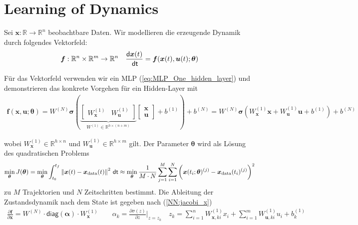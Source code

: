\documentclass[a4paper, 12pt]{scrartcl}
\newcommand{\norm}[1]{\left\lVert#1\right\lVert}
\newcommand{\dt}{\thinspace \mathsf{dt}}
\begin{document}
\newpage


\section{Learning of Dynamics}


Sei $\bm{x}:\mathbb{R} \to \mathbb{R}^n$ beobachtbare Daten.
Wir modellieren die erzeugende Dynamik durch folgendes Vektorfeld:
\begin{align}
    \bm{f}:\mathbb{R}^{n} \times \mathbb{R}^{m} \to \mathbb{R}^n
    \quad
    \frac{\mathsf{d} \bm{x}(t)}{\dt} = \bm{f}(\bm{x}(t), \bm{u}(t); \bm{\theta}) 
    \label{eq:Neural_Dynamic}
\end{align}

Für das Vektorfeld verwenden wir ein MLP (\ref{eq:MLP_One_hidden_layer}) 
und demonstrieren das konkrete Vorgehen für ein Hidden-Layer mit
%
\begin{align}\label{eq:MLP_with_control}
    \bm{f}(\bm{x},\bm{u};{\bm{\theta}})
    =
    W^{(N)} \bm{\sigma}
    \left(
        \underbrace{
            \begin{bmatrix}
                W_{\bm{x}}^{(1)} 
                &
                W_{\bm{u}}^{(1)} 
            \end{bmatrix} 
        }_{W^{(1)} \in \mathbb{R}^{h \times (n+m)}}
        \begin{bmatrix}
            \bm{x} \\
            \bm{u}    
        \end{bmatrix}
        + 
        b^{(1)}
    \right)
    +
    b^{(N)}
    =
    W^{(N)} \bm{\sigma}
    \left(
        W_{\bm{x}}^{(1)} \bm{x} + W_{\bm{u}}^{(1)} \bm{u} + b^{(1)}
    \right)
    +
    b^{(N)}
\end{align}

wobei $W_{\bm{x}}^{(1)} \in \mathbb{R}^{h \times n}$ 
und $W_{\bm{u}}^{(1)} \in \mathbb{R}^{h \times m}$ gilt.
Der Parameter $\bm{\theta}$ wird als Lösung des quadratischen Problems 
\begin{align*}
    \min_{\bm{\theta}}
    J(\bm{\theta}) 
    =
    \min_{\bm{\theta}}
    \int_{t_0}^{t_f}
    \norm{\bm{x}(t) - \bm{x}_{\text{data}}(t)}^2 \dt
    \approx
    \min_{\bm{\theta}}
    \frac{1}{M \cdot N}
    \sum_{j=1}^{M}
    \sum_{i=1}^{N}
    \left(
        \vphantom{\int}
        \bm{x}(t_i; \bm{\theta})^{(j)} - \bm{x}_{\text{data}}(t_i)^{(j)}
    \right)^2
\end{align*}
%
zu $M$ Trajektorien und $N$ Zeitschritten bestimmt. 
Die Ableitung der Zustandsdynamik nach dem State ist gegeben nach (\ref{NN:jacobi_x})
\begin{align}\label{dynamics:f_x}
    \frac{\partial \bm{f}}{\partial \bm{x}} 
    =
    W^{(N)} \cdot \mathsf{diag}\left(\bm{\alpha}\right) \cdot W^{(1)}_{\bm{x}}
    \qquad
    \alpha_k
    =
    \frac{\partial \sigma(z)}{\partial z}
    \bigg|_{z= z_k}
    \quad
    z_k 
    = 
    \sum_{i=1}^{n} W_{\bm{x}, ki}^{(1)} x_i 
    + 
    \sum_{i=1}^{m} W_{\bm{u}, ki}^{(1)} u_i
    +
    b^{(1)}_k
\end{align}
\end{document}
